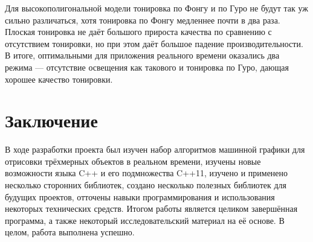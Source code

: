 \documentclass[a4paper,12pt]{report}
\numberwithin{equation}{section}
\begin{document}
Для высокополигональной модели тонировка по Фонгу и по Гуро не будут так уж сильно различаться, хотя тонировка по Фонгу медленнее почти в два раза. Плоская тонировка не даёт большого прироста качества по сравнению с отсутствием тонировки, но при этом даёт большое падение производительности. В итоге, оптимальными для приложения реального времени оказались два режима --- отсутствие освещения как такового и тонировка по Гуро, дающая хорошее качество тонировки.

\section*{Заключение}
В ходе разработки проекта был изучен набор алгоритмов машинной графики для отрисовки трёхмерных объектов в реальном времени, изучены новые возможности языка C++ и его подмножества C++11, изучено и применено несколько сторонних библиотек, создано несколько полезных библиотек для будущих проектов, отточены навыки программирования и использования некоторых технических средств. Итогом работы является целиком завершённая программа, а также некоторый исследовательский материал на её основе. В целом, работа выполнена успешно.

\newpage
\printbibliography[heading=bibintoc]
\end{document}
